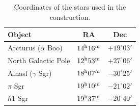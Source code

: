 \documentclass[a4paper,12pt]{extarticle}
\begin{document}
	\begin{table}[H]
		\centering
		\caption{Coordinates of the stars used in the construction.}
		\begin{tabular}{lcc}
			\hline
			\textbf{Object} & \textbf{RA} & \textbf{Dec} \\
			\hline
			Arcturus (\(\alpha\) Boo) & \(14^{\rm h}16^{\rm m}\) & \(+19^\circ03'\) \\
			North Galactic Pole & \(12^{\rm h}53^{\rm m}\) & \(+27^\circ06'\) \\
			Alnasl (\(\gamma\) Sgr) & \(18^{\rm h}07^{\rm m}\) & \(-30^\circ25'\) \\
			\(\pi\) Sgr & \(19^{\rm h}10^{\rm m}\) & \(-21^\circ02'\) \\
			\(h1\) Sgr & \(19^{\rm h}37^{\rm m}\) & \(-20^\circ40'\) \\
			\hline
		\end{tabular}
	\end{table}
\end{document}
